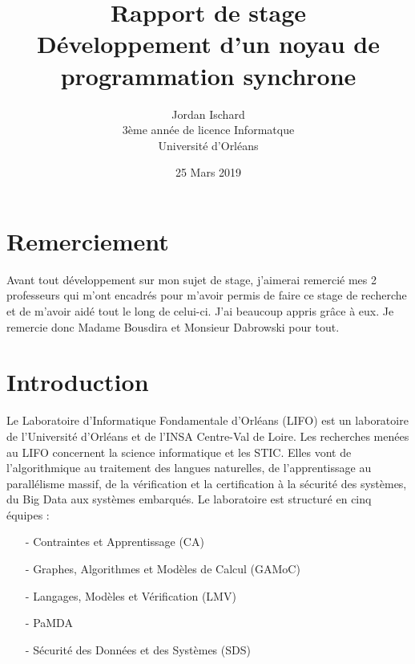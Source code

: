 \documentclass[10pt,a4paper]{article}
\begin{document}
		
	\title{\textbf{Rapport de stage \\ Développement d'un noyau de programmation synchrone}}
	\date{25 Mars 2019}
	\author{Jordan Ischard\\3ème année de licence Informatque \\ Université d'Orléans}
	\maketitle
	\newpage
	
	
	\tableofcontents
	\newpage
	
	\section{Remerciement}
		Avant tout développement sur mon sujet de stage, j'aimerai remercié mes 2 professeurs qui m'ont encadrés pour m'avoir permis de faire ce stage de recherche et de m'avoir aidé tout le long de celui-ci. J'ai beaucoup appris grâce à eux. Je remercie donc Madame Bousdira et Monsieur Dabrowski pour tout.
	\bigbreak
	
	\section{Introduction}

		
		
		Le Laboratoire d'Informatique Fondamentale d'Orléans (LIFO) est un laboratoire de l'Université d'Orléans et de l'INSA Centre-Val de Loire. 
		\smallbreak
		Les recherches menées au LIFO concernent la science informatique et les STIC. Elles vont de l'algorithmique au traitement des langues naturelles, de l'apprentissage au parallélisme massif, de la vérification et la certification à la sécurité des systèmes, du Big Data aux systèmes embarqués. Le laboratoire est structuré en cinq équipes :
		\begin{enumerate}
			\item[-] Contraintes et Apprentissage (CA)
		    \item[-] Graphes, Algorithmes et Modèles de Calcul (GAMoC)
		    \item[-] Langages, Modèles et Vérification (LMV)
		    \item[-] PaMDA                                                   %
			\item[-]  Sécurité des Données et des Systèmes (SDS)
		\end{enumerate}
		\medbreak
		
\end{document}
